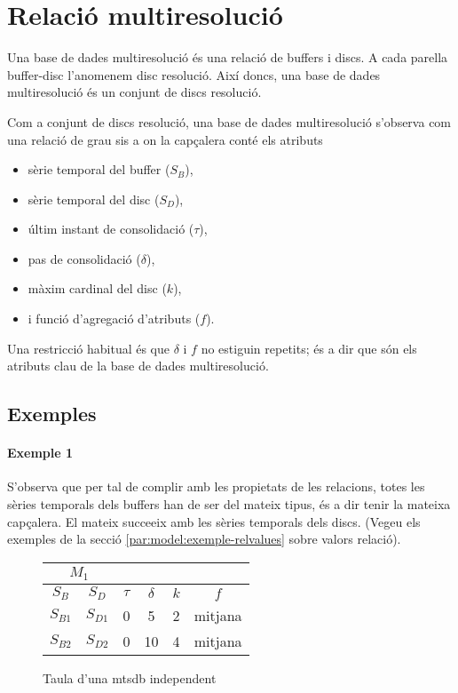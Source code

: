 \section{Relació multiresolució}



Una base de dades multiresolució és una relació de buffers i discs. A cada parella buffer-disc l'anomenem disc resolució. Així doncs, una base de dades multiresolució és un conjunt de discs resolució.

Com a conjunt de discs resolució, una base de dades multiresolució
s'observa com una relació de grau sis a on la capçalera conté els
atributs
\begin{itemize}
\item sèrie temporal del buffer ($S_B$),
\item sèrie temporal del disc ($S_D$),
\item últim instant de consolidació ($\tau$),
\item pas de consolidació ($\delta$),
\item màxim cardinal del disc ($k$),
\item i funció d'agregació d'atributs ($f$).
\end{itemize}

Una restricció habitual és que $\delta$ i $f$ no estiguin repetits; és
a dir que són els atributs clau de la base de dades multiresolució.





\subsection{Exemples}

\paragraph{Exemple 1}


S'observa que per tal de complir amb les propietats de les relacions, totes les sèries temporals dels buffers han de ser del mateix tipus, és a dir tenir la mateixa capçalera. El mateix succeeix amb les sèries temporals dels discs. (Vegeu els exemples de la secció \ref{par:model:exemple-relvalues} sobre valors relació).

\begin{figure}[tp]
  \centering
  \begin{tabular}{|c|c|c|c|c|c|}
    \multicolumn{2}{c}{$M_1$} \\ \hline
    $S_B$  & $S_D$ & $\tau$ & $\delta$ & $k$ & $f$ \\ \hline
    $S_{B1}$ & $S_{D1}$ & 0 & 5  & 2 & mitjana  \\
    $S_{B2}$ & $S_{D2}$ & 0 & 10 & 4 & mitjana  \\ \hline
  \end{tabular}
  \caption{Taula d'una mtsdb independent}
  \label{fig:model:mtsdb:independent}
\end{figure}







